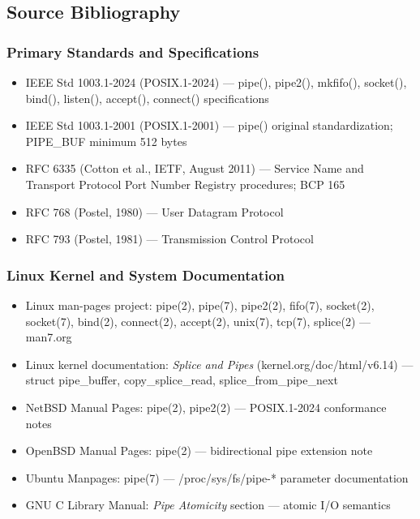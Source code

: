 \documentclass[11pt,letterpaper]{article}
\begin{document}
\subsection{Source Bibliography}

\subsubsection{Primary Standards and Specifications}

\begin{itemize}[leftmargin=1.5em]
  \item IEEE Std 1003.1-2024 (POSIX.1-2024) --- pipe(), pipe2(), mkfifo(), socket(), bind(), listen(), accept(), connect() specifications
  \item IEEE Std 1003.1-2001 (POSIX.1-2001) --- pipe() original standardization; PIPE\_BUF minimum 512 bytes
  \item RFC 6335 (Cotton et al., IETF, August 2011) --- Service Name and Transport Protocol Port Number Registry procedures; BCP 165
  \item RFC 768 (Postel, 1980) --- User Datagram Protocol
  \item RFC 793 (Postel, 1981) --- Transmission Control Protocol
\end{itemize}

\subsubsection{Linux Kernel and System Documentation}

\begin{itemize}[leftmargin=1.5em]
  \item Linux man-pages project: pipe(2), pipe(7), pipe2(2), fifo(7), socket(2), socket(7), bind(2), connect(2), accept(2), unix(7), tcp(7), splice(2) --- man7.org
  \item Linux kernel documentation: \textit{Splice and Pipes} (kernel.org/doc/html/v6.14) --- struct pipe\_buffer, copy\_splice\_read, splice\_from\_pipe\_next
  \item NetBSD Manual Pages: pipe(2), pipe2(2) --- POSIX.1-2024 conformance notes
  \item OpenBSD Manual Pages: pipe(2) --- bidirectional pipe extension note
  \item Ubuntu Manpages: pipe(7) --- /proc/sys/fs/pipe-* parameter documentation
  \item GNU C Library Manual: \textit{Pipe Atomicity} section --- atomic I/O semantics
\end{itemize}
\end{document}
